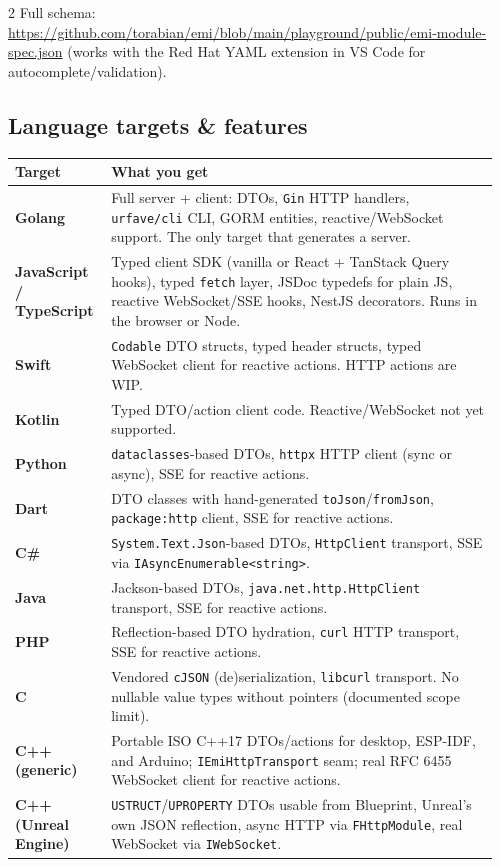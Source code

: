\documentclass[10pt,a4paper]{extarticle}
\begin{document}
\begin{multicols}{2}
\raggedcolumns
Full schema:
\url{https://github.com/torabian/emi/blob/main/playground/public/emi-module-spec.json}
(works with the Red Hat YAML extension in VS Code for
autocomplete/validation).

\subsection*{Language targets \& features}
\end{multicols}

{\small
\begin{tabular}{@{}p{0.19\linewidth}p{0.77\linewidth}@{}}
\toprule
\textbf{Target} & \textbf{What you get} \\
\midrule
\textbf{Golang} & Full server + client: DTOs, \texttt{Gin} HTTP handlers, \texttt{urfave/cli} CLI, GORM entities, reactive/WebSocket support. The only target that generates a server. \\
\textbf{JavaScript / TypeScript} & Typed client SDK (vanilla or React + TanStack Query hooks), typed \texttt{fetch} layer, JSDoc typedefs for plain JS, reactive WebSocket/SSE hooks, NestJS decorators. Runs in the browser or Node. \\
\textbf{Swift} & \texttt{Codable} DTO structs, typed header structs, typed WebSocket client for reactive actions. HTTP actions are WIP. \\
\textbf{Kotlin} & Typed DTO/action client code. Reactive/WebSocket not yet supported. \\
\textbf{Python} & \texttt{dataclasses}-based DTOs, \texttt{httpx} HTTP client (sync or async), SSE for reactive actions. \\
\textbf{Dart} & DTO classes with hand-generated \texttt{toJson}/\texttt{fromJson}, \texttt{package:http} client, SSE for reactive actions. \\
\textbf{C\#} & \texttt{System.Text.Json}-based DTOs, \texttt{HttpClient} transport, SSE via \texttt{IAsyncEnumerable<string>}. \\
\textbf{Java} & Jackson-based DTOs, \texttt{java.net.http.HttpClient} transport, SSE for reactive actions. \\
\textbf{PHP} & Reflection-based DTO hydration, \texttt{curl} HTTP transport, SSE for reactive actions. \\
\textbf{C} & Vendored \texttt{cJSON} (de)serialization, \texttt{libcurl} transport. No nullable value types without pointers (documented scope limit). \\
\textbf{C++ (generic)} & Portable ISO C++17 DTOs/actions for desktop, ESP-IDF, and Arduino; \texttt{IEmiHttpTransport} seam; real RFC 6455 WebSocket client for reactive actions. \\
\textbf{C++ (Unreal Engine)} & \texttt{USTRUCT}/\texttt{UPROPERTY} DTOs usable from Blueprint, Unreal's own JSON reflection, async HTTP via \texttt{FHttpModule}, real WebSocket via \texttt{IWebSocket}. \\
\bottomrule
\end{tabular}
}
\end{document}
